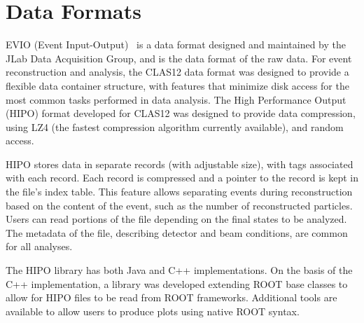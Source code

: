 \section{Data Formats}
\label{sec-formats}

EVIO (Event Input-Output)~\cite{evio} is a data format designed and maintained by the JLab Data Acquisition
Group, and is the data format of the raw data. For event reconstruction and analysis, the CLAS12 data format
was designed to provide a flexible data container structure, with features that minimize disk access for the
most common tasks performed in data analysis. The High Performance Output (HIPO) format developed for
CLAS12 was designed to provide data compression, using LZ4 (the fastest compression algorithm currently
available), and random access.

HIPO stores data in separate records (with adjustable size), with tags associated with each record. Each record
is compressed and a pointer to the record is kept in the file's index table. This feature allows separating events
during reconstruction based on the content of the event, such as the number of reconstructed particles. Users can
read portions of the file depending on the final states to be analyzed.  The metadata of the file, describing detector
and beam conditions, are common for all analyses.

The HIPO library has both Java and C++ implementations. On the basis of the C++ implementation, a library was
developed extending ROOT base classes to allow for HIPO files to be read from ROOT frameworks. Additional
tools are available to allow users to produce plots using native ROOT syntax.
